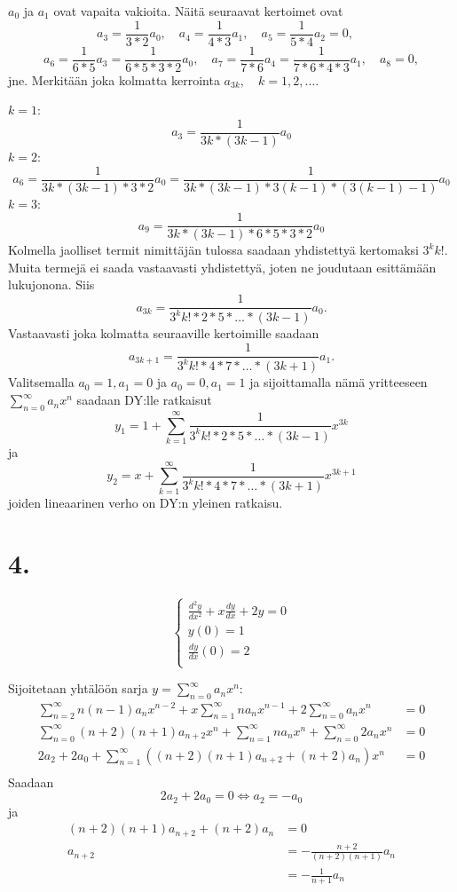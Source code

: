 \documentclass{article}
\begin{document}
$a_0$ ja $a_1$ ovat vapaita vakioita. Näitä seuraavat kertoimet ovat
\[
  a_3 = \frac{1}{3*2}a_0, \quad
  a_4 = \frac{1}{4*3}a_1, \quad
  a_5 = \frac{1}{5*4}a_2 = 0, \quad
\]
\[
  a_6 = \frac{1}{6*5}a_3 = \frac{1}{6*5*3*2}a_0, \quad
  a_7 = \frac{1}{7*6}a_4 = \frac{1}{7*6*4*3}a_1, \quad
  a_8 = 0,
\]
jne. Merkitään joka kolmatta kerrointa $a_{3k}, \quad k = 1,2,\dots$.

$k = 1$:
\[
  a_3 = \frac{1}{3k * (3k-1)}a_0
\]
$k = 2$:
\[
  a_6 = \frac{1}{3k * (3k-1) * 3 * 2}a_0 = \frac{1}{3k * (3k-1) * 3(k-1) * (3(k-1)-1)}a_0
\]
$k = 3$:
\[
  a_9 = \frac{1}{3k * (3k-1) * 6 * 5 * 3 * 2}a_0
\]
Kolmella jaolliset termit nimittäjän tulossa saadaan yhdistettyä kertomaksi
$3^kk!$. Muita termejä ei saada vastaavasti yhdistettyä, joten ne joudutaan
esittämään lukujonona. Siis
\[
  a_{3k} = \frac{1}{3^kk! * 2 * 5 * \dots * (3k-1)}a_0.
\]
Vastaavasti joka kolmatta seuraaville kertoimille saadaan
\[
  a_{3k+1} = \frac{1}{3^kk! * 4 * 7 * \dots * (3k+1)}a_1.
\]
Valitsemalla $a_0 = 1, a_1 = 0$ ja $a_0 = 0, a_1 = 1$ ja sijoittamalla nämä
yritteeseen $\sum_{n=0}^{\infty} a_nx^n$ saadaan DY:lle ratkaisut
\[
  y_1 = 1 + \sum_{k=1}^{\infty} \frac{1}{3^kk! * 2 * 5 * \dots * (3k-1)}x^{3k}
\]
ja
\[
  y_2 = x + \sum_{k=1}^{\infty} \frac{1}{3^kk! * 4 * 7 * \dots * (3k+1)}x^{3k+1}
\]
joiden lineaarinen verho on DY:n yleinen ratkaisu.

\section*{4.}

\[
  \begin{cases}
    \frac{d^2 y}{d x^2} + x\frac{dy}{dx} + 2y = 0 \\
    y(0) = 1 \\
    \frac{dy}{dx}(0) = 2 \\
  \end{cases}
\]

Sijoitetaan yhtälöön sarja $y = \sum_{n=0}^{\infty} a_nx^n$:
\begin{align*}
  \sum_{n=2}^{\infty} n(n-1)a_nx^{n-2} + x\sum_{n=1}^{\infty} na_nx^{n-1} + 2\sum_{n=0}^{\infty} a_nx^n &= 0 \\
  \sum_{n=0}^{\infty} (n+2)(n+1)a_{n+2}x^{n} + \sum_{n=1}^{\infty} na_nx^{n} + \sum_{n=0}^{\infty} 2a_nx^n &= 0 \\
  2a_2 + 2a_0 + \sum_{n=1}^{\infty} ((n+2)(n+1)a_{n+2} + (n + 2)a_n)x^n &= 0 \\
\end{align*}
Saadaan
\[
  2a_2 + 2a_0 = 0 \iff a_2 = -a_0
\]
ja
\begin{align*}
  (n+2)(n+1)a_{n+2} + (n+2)a_n &= 0 \\
  a_{n+2} &= -\frac{n+2}{(n+2)(n+1)}a_n \\
          &= -\frac{1}{n+1}a_n \\
\end{align*}
\end{document}
